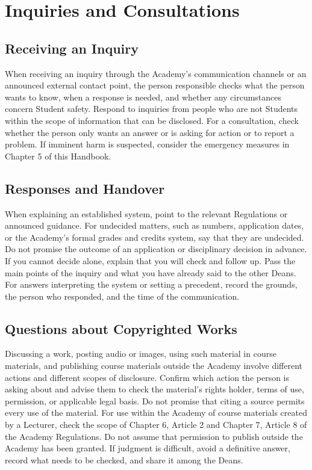 \newpage
\chapter{Inquiries and Consultations}

\section{Receiving an Inquiry}

When receiving an inquiry through the Academy's communication channels or an announced external contact point, the person responsible checks what the person wants to know, when a response is needed, and whether any circumstances concern Student safety.
Respond to inquiries from people who are not Students within the scope of information that can be disclosed.
For a consultation, check whether the person only wants an answer or is asking for action or to report a problem.
If imminent harm is suspected, consider the emergency measures in Chapter 5 of this Handbook.

\section{Responses and Handover}

When explaining an established system, point to the relevant Regulations or announced guidance.
For undecided matters, such as numbers, application dates, or the Academy's formal grades and credits system, say that they are undecided. Do not promise the outcome of an application or disciplinary decision in advance.
If you cannot decide alone, explain that you will check and follow up. Pass the main points of the inquiry and what you have already said to the other Deans.
For answers interpreting the system or setting a precedent, record the grounds, the person who responded, and the time of the communication.

\section{Questions about Copyrighted Works}

Discussing a work, posting audio or images, using such material in course materials, and publishing course materials outside the Academy involve different actions and different scopes of disclosure.
Confirm which action the person is asking about and advise them to check the material's rights holder, terms of use, permission, or applicable legal basis.
Do not promise that citing a source permits every use of the material.
For use within the Academy of course materials created by a Lecturer, check the scope of Chapter 6, Article 2 and Chapter 7, Article 8 of the Academy Regulations. Do not assume that permission to publish outside the Academy has been granted.
If judgment is difficult, avoid a definitive answer, record what needs to be checked, and share it among the Deans.
